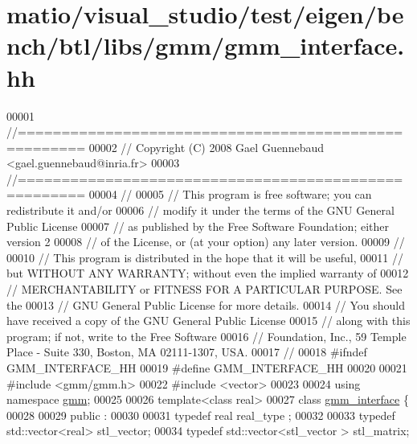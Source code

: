 \hypertarget{matio_2visual__studio_2test_2eigen_2bench_2btl_2libs_2gmm_2gmm__interface_8hh_source}{}\section{matio/visual\+\_\+studio/test/eigen/bench/btl/libs/gmm/gmm\+\_\+interface.hh}
\label{matio_2visual__studio_2test_2eigen_2bench_2btl_2libs_2gmm_2gmm__interface_8hh_source}

\begin{DoxyCode}
00001 \textcolor{comment}{//=====================================================}
00002 \textcolor{comment}{// Copyright (C) 2008 Gael Guennebaud <gael.guennebaud@inria.fr>}
00003 \textcolor{comment}{//=====================================================}
00004 \textcolor{comment}{//}
00005 \textcolor{comment}{// This program is free software; you can redistribute it and/or}
00006 \textcolor{comment}{// modify it under the terms of the GNU General Public License}
00007 \textcolor{comment}{// as published by the Free Software Foundation; either version 2}
00008 \textcolor{comment}{// of the License, or (at your option) any later version.}
00009 \textcolor{comment}{//}
00010 \textcolor{comment}{// This program is distributed in the hope that it will be useful,}
00011 \textcolor{comment}{// but WITHOUT ANY WARRANTY; without even the implied warranty of}
00012 \textcolor{comment}{// MERCHANTABILITY or FITNESS FOR A PARTICULAR PURPOSE.  See the}
00013 \textcolor{comment}{// GNU General Public License for more details.}
00014 \textcolor{comment}{// You should have received a copy of the GNU General Public License}
00015 \textcolor{comment}{// along with this program; if not, write to the Free Software}
00016 \textcolor{comment}{// Foundation, Inc., 59 Temple Place - Suite 330, Boston, MA  02111-1307, USA.}
00017 \textcolor{comment}{//}
00018 \textcolor{preprocessor}{#ifndef GMM\_INTERFACE\_HH}
00019 \textcolor{preprocessor}{#define GMM\_INTERFACE\_HH}
00020 
00021 \textcolor{preprocessor}{#include <gmm/gmm.h>}
00022 \textcolor{preprocessor}{#include <vector>}
00023 
00024 \textcolor{keyword}{using namespace }\hyperlink{namespacegmm}{gmm};
00025 
00026 \textcolor{keyword}{template}<\textcolor{keyword}{class} real>
00027 \textcolor{keyword}{class }\hyperlink{classgmm__interface}{gmm\_interface} \{
00028 
00029 public :
00030 
00031   \textcolor{keyword}{typedef} real real\_type ;
00032 
00033   \textcolor{keyword}{typedef} std::vector<real>  stl\_vector;
00034   \textcolor{keyword}{typedef} std::vector<stl\_vector > stl\_matrix;

\end{DoxyCode}
